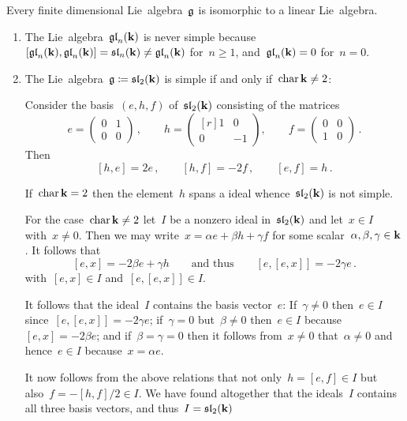 \begin{theorem}[Ado]
  Every finite dimensional Lie~algebra~$\mathfrak{g}$ is isomorphic to a linear Lie~algebra.
\end{theorem}


\begin{examples}
  \leavevmode
  \begin{enumerate}
    \item
      The Lie~algebra~$\mathfrak{gl}_n(\mathbf{k})$ is never simple because~$[\mathfrak{gl}_n(\mathbf{k}), \mathfrak{gl}_n(\mathbf{k})] = \mathfrak{sl}_n(\mathbf{k}) \neq \mathfrak{gl}_n(\mathbf{k})$ for~$n \geq 1$, and~$\mathfrak{gl}_n(\mathbf{k}) = 0$ for~$n = 0$.
    \item
      The Lie~algebra~$\mathfrak{g} \coloneqq \mathfrak{sl}_2(\mathbf{k})$ is simple if and only if~$\operatorname{char} \mathbf{k} \neq 2$:
      
      Consider the basis~$(e,h,f)$ of~$\mathfrak{sl}_2(\mathbf{k})$ consisting of the matrices
      \[
        e
        =
        \begin{pmatrix}
          0 & 1 \\
          0 & 0
        \end{pmatrix} \,,
        \qquad
        h
        =
        \begin{pmatrix*}[r]
          1 &  0  \\
          0 & -1
        \end{pmatrix*},
        \qquad
        f
        =
        \begin{pmatrix}
          0 & 0 \\
          1 & 0
        \end{pmatrix} \,.
      \]
      Then
      \[
        [h,e] = 2e  \,,
        \qquad
        [h,f] = -2f \,,
        \qquad
        [e,f] = h \,.
      \]
      
      If~$\operatorname{char} \mathbf{k} = 2$ then the element~$h$ spans a {\onedimensional} ideal whence~$\mathfrak{sl}_2(\mathbf{k})$ is not simple.
      
      For the case~$\operatorname{char} \mathbf{k} \neq 2$ let~$I$ be a nonzero ideal in~$\mathfrak{sl}_2(\mathbf{k})$ and let~$x \in I$ with~$x \neq 0$.
      Then we may write~$x = \alpha e + \beta h + \gamma f$ for some scalar~$\alpha, \beta, \gamma \in \mathbf{k}$.
      It follows that
      \[
        [e,x]
        =
        -2 \beta e + \gamma h
        \qquad \text{and thus}\qquad
        [e,[e,x]]
        =
        -2 \gamma e \,.
      \]
      with~$[e,x] \in I$ and~$[e,[e,x]] \in I$.
      
      It follows that the ideal~$I$ contains the basis vector~$e$:
      If~$\gamma \neq 0$ then~$e \in I$ since~$[e,[e,x]] = -2 \gamma e$;
      if~$\gamma = 0$ but~$\beta \neq 0$ then~$e \in I$ because~$[e,x] = -2 \beta e$;
      and if~$\beta = \gamma = 0$ then it follows from~$x \neq 0$ that~$\alpha \neq 0$ and hence~$e \in I$ because~$x = \alpha e$.
      
      It now follows from the above relations that not only~$h = [e,f] \in I$ but also~$f = -[h,f]/2 \in I$.
      We have found altogether that the ideals~$I$ contains all three basis vectors, and thus~$I = \mathfrak{sl}_2(\mathbf{k})$
  \end{enumerate}
\end{examples}


